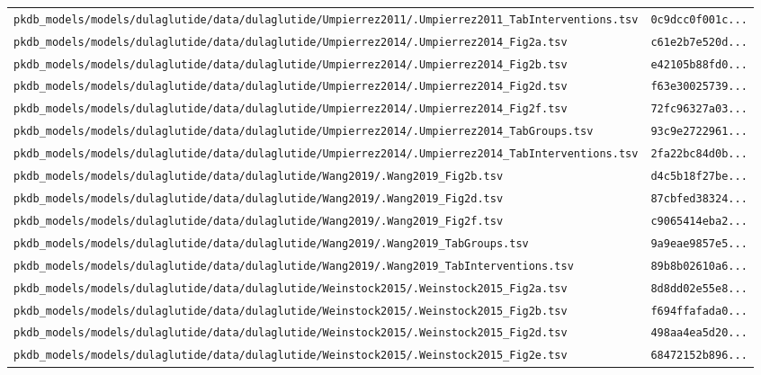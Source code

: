 \begin{longtable}{ll}
\texttt{pkdb\_models/models/dulaglutide/data/dulaglutide/Umpierrez2011/.Umpierrez2011\_TabInterventions.tsv} & \texttt{0c9dcc0f001c...} \\
\texttt{pkdb\_models/models/dulaglutide/data/dulaglutide/Umpierrez2014/.Umpierrez2014\_Fig2a.tsv} & \texttt{c61e2b7e520d...} \\
\texttt{pkdb\_models/models/dulaglutide/data/dulaglutide/Umpierrez2014/.Umpierrez2014\_Fig2b.tsv} & \texttt{e42105b88fd0...} \\
\texttt{pkdb\_models/models/dulaglutide/data/dulaglutide/Umpierrez2014/.Umpierrez2014\_Fig2d.tsv} & \texttt{f63e30025739...} \\
\texttt{pkdb\_models/models/dulaglutide/data/dulaglutide/Umpierrez2014/.Umpierrez2014\_Fig2f.tsv} & \texttt{72fc96327a03...} \\
\texttt{pkdb\_models/models/dulaglutide/data/dulaglutide/Umpierrez2014/.Umpierrez2014\_TabGroups.tsv} & \texttt{93c9e2722961...} \\
\texttt{pkdb\_models/models/dulaglutide/data/dulaglutide/Umpierrez2014/.Umpierrez2014\_TabInterventions.tsv} & \texttt{2fa22bc84d0b...} \\
\texttt{pkdb\_models/models/dulaglutide/data/dulaglutide/Wang2019/.Wang2019\_Fig2b.tsv} & \texttt{d4c5b18f27be...} \\
\texttt{pkdb\_models/models/dulaglutide/data/dulaglutide/Wang2019/.Wang2019\_Fig2d.tsv} & \texttt{87cbfed38324...} \\
\texttt{pkdb\_models/models/dulaglutide/data/dulaglutide/Wang2019/.Wang2019\_Fig2f.tsv} & \texttt{c9065414eba2...} \\
\texttt{pkdb\_models/models/dulaglutide/data/dulaglutide/Wang2019/.Wang2019\_TabGroups.tsv} & \texttt{9a9eae9857e5...} \\
\texttt{pkdb\_models/models/dulaglutide/data/dulaglutide/Wang2019/.Wang2019\_TabInterventions.tsv} & \texttt{89b8b02610a6...} \\
\texttt{pkdb\_models/models/dulaglutide/data/dulaglutide/Weinstock2015/.Weinstock2015\_Fig2a.tsv} & \texttt{8d8dd02e55e8...} \\
\texttt{pkdb\_models/models/dulaglutide/data/dulaglutide/Weinstock2015/.Weinstock2015\_Fig2b.tsv} & \texttt{f694ffafada0...} \\
\texttt{pkdb\_models/models/dulaglutide/data/dulaglutide/Weinstock2015/.Weinstock2015\_Fig2d.tsv} & \texttt{498aa4ea5d20...} \\
\texttt{pkdb\_models/models/dulaglutide/data/dulaglutide/Weinstock2015/.Weinstock2015\_Fig2e.tsv} & \texttt{68472152b896...} \\

\end{longtable}
